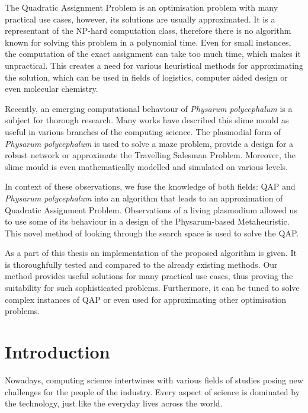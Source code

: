 \documentclass[english,a4paper,twoside]{ppfcmthesis}
\begin{document}
The Quadratic Assignment Problem is an optimisation problem with many practical use cases, however, its solutions are usually approximated. It is a representant of the NP-hard computation class, therefore there is no algorithm known for solving this problem in a polynomial time. Even for small instances, the computation of the exact assignment can take too much time, which makes it unpractical. This creates a need for various heuristical methods for approximating the solution, which can be used in fields of logistics, computer aided design or even molecular chemistry.

Recently, an emerging computational behaviour of \textit{Physarum polycephalum} is a subject for thorough research. Many works have described this slime mould as useful in various branches of the computing science. The plasmodial form of \textit{Physarum polycephalum} is used to solve a maze problem, provide a design for a robust network or approximate the Travelling Salesman Problem. Moreover, the slime mould is even mathematically modelled and simulated on various levels.

In context of these observations, we fuse the knowledge of both fields: QAP and \textit{Physarum polycephalum} into an algorithm that leads to an approximation of Quadratic Assignment Problem. Observations of a living plasmodium allowed us to use some of its behaviour in a design of the Physarum-based Metaheuristic. This novel method of looking through the search space is used to solve the QAP.

As a part of this thesis an implementation of the proposed algorithm is given. It is thoroughfully tested and compared to the already existing methods. Our method provides useful solutions for many practical use cases, thus proving the suitability for such sophisticated problems. Furthermore, it can be tuned to solve complex instances of QAP or even used for approximating other optimisation problems.
\cleardoublepage

\pagestyle{ppfcmthesis}%
\tableofcontents* \cleardoublepage%

\mainmatter%

\chapter{Introduction}
\label{chapter:introduction}

Nowadays, computing science intertwines with various fields of studies posing new challenges for the people of the industry. Every aspect of science is dominated by the technology, just like the everyday lives across the world.
\end{document}
